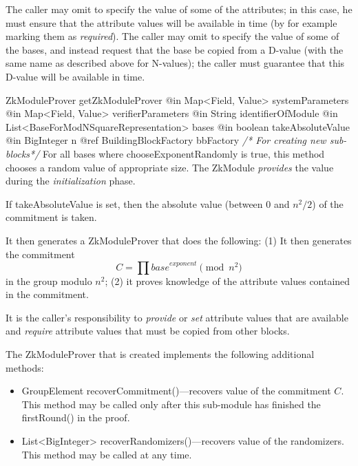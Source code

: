     The caller may omit to specify the value of some of the attributes; in this case, he must
    ensure that the attribute values will be available in time (by for example marking them as \emph{required}).
    The caller may omit to specify the value of some of the bases, and instead request
    that the base be copied from a D-value (with the same name as described above for N-values);
    the caller must guarantee that this D-value will be available in time.
      \begin{method}
      {ZkModuleProver}
      {getZkModuleProver}
      {
        {@in Map<Field, Value> systemParameters}
        {@in Map<Field, Value> verifierParameters}
        {@in String identifierOfModule}
        {@in List<BaseForModNSquareRepresentation> bases}
        {@in boolean takeAbsoluteValue}
        {@in BigInteger n}
        {@ref BuildingBlockFactory bbFactory \textrm{\emph{/* For creating new sub-blocks*/}}}
      }
      For all bases where chooseExponentRandomly is true, this method chooses a random value of
      appropriate size.
      The ZkModule \emph{provides} the value during the \emph{initialization} phase.

      If takeAbsoluteValue is set, then the absolute value (between $0$ and $n^2/2$) of the commitment
      is taken.

      It then generates a ZkModuleProver that does the following:
      (1) It then generates the commitment $$C = \prod \textit{base}^\textit{exponent} \pmod{n^2}$$
      in the group modulo $n^2$;
      (2) it proves knowledge of the attribute values contained in the commitment.

      It is the caller's responsibility to \emph{provide} or \emph{set} attribute values that are available and \emph{require}
      attribute values that must be copied from other blocks.

      The ZkModuleProver that is created implements the following additional methods:
        \begin{itemize}
          \item GroupElement recoverCommitment()---recovers value of the commitment $C$. This method may be called only after this sub-module
             has finished the firstRound() in the proof.
          \item List<BigInteger> recoverRandomizers()---recovers value of the randomizers. This method may be called at any time.
        \end{itemize}

      \end{method}
